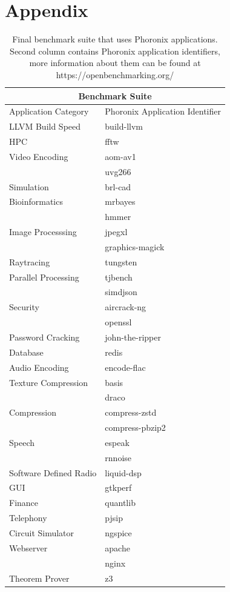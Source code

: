 \section{Appendix} \label{sec:appendix}

\begin{table}[H]
\centering
\begin{tabular}{ |p{5cm}|p{5cm}|  }
 \hline
 \multicolumn{2}{|c|}{Benchmark Suite} \\
 \hline
 Application Category & Phoronix Application Identifier\\
 \hline
 \hline
 LLVM Build Speed   & build-llvm    \\
 \hline
 HPC & fftw    \\
 \hline
 Video Encoding & aom-av1    \\
 & uvg266    \\
 \hline
 Simulation & brl-cad \\
 \hline
 Bioinformatics & mrbayes \\
 & hmmer \\
 \hline
 Image Processsing & jpegxl \\
 & graphics-magick \\
 \hline
 Raytracing & tungsten \\
 \hline
 Parallel Processing & tjbench \\
 & simdjson \\
 \hline
 Security & aircrack-ng \\
 & openssl \\
 \hline
 Password Cracking & john-the-ripper \\
 \hline
 Database & redis \\
 \hline
 Audio Encoding & encode-flac \\
 \hline
 Texture Compression & basis \\
 & draco \\
 \hline
 Compression & compress-zstd \\
 & compress-pbzip2 \\
 \hline
 Speech & espeak \\
 & rnnoise \\
 \hline
 Software Defined Radio & liquid-dsp \\
 \hline
 GUI & gtkperf \\
 \hline
 Finance & quantlib \\
 \hline
 Telephony & pjsip \\
 \hline
 Circuit Simulator & ngspice \\
 \hline
 Webserver & apache \\
 & nginx \\
 \hline
 Theorem Prover & z3 \\
 \hline
\end{tabular}
\caption{\label{tab:suite} Final benchmark suite that uses Phoronix
applications. Second column contains Phoronix application identifiers, more
information about them can be found at https://openbenchmarking.org/}
\end{table}

